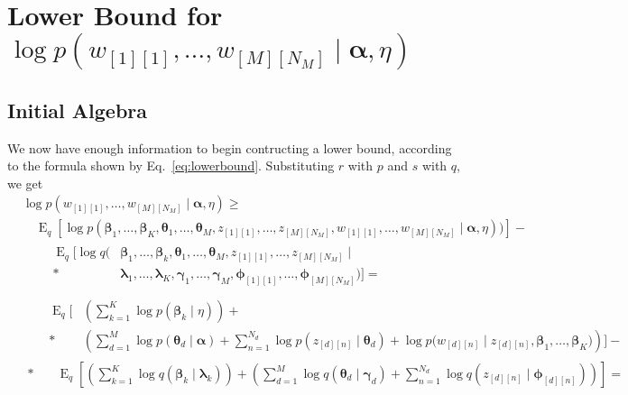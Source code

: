 \documentclass[12pt]{article}
\newcommand{\E}{\operatorname{E}}
\begin{document}
\section{Lower Bound for $\log{p(w_{[1][1]}, \ldots, w_{[M][N_{M}]} \mid
\bm{\alpha}, \eta)}$}

\subsection{Initial Algebra}

We now have enough information to begin contructing a lower bound, according to
the formula shown by Eq.~\ref{eq:lowerbound}.  Substituting $r$ with $p$ and $s$
with $q$, we get
\begin{align}
    &\log{p(w_{[1][1]}, \ldots, w_{[M][N_{M}]} \mid \bm{\alpha}, \eta)} \geq
    \nonumber\\
    &\quad\E_{q}[\log{p(\bm{\beta}_{1}, \ldots, \bm{\beta}_{K}, \bm{\theta}_{1},
    \ldots,
    \bm{\theta}_{M}, z_{[1][1]}, \ldots, z_{[M][N_{M}]}, w_{[1][1]}, \ldots,
    w_{[M][N_{M}]} \mid \bm{\alpha}, \eta))}] - \nonumber\\
    &\quad\quad\begin{aligned}
    \E_{q}[\log q(&\bm{\beta}_{1}, \ldots, \bm{\beta}_{k}, \bm{\theta}_{1}, \ldots,
    \bm{\theta}_{M}, z_{[1][1]}, \ldots, z_{[M][N_{M}]} \mid \\*
    &\bm{\lambda}_{1},
    \ldots, \bm{\lambda}_{K}, \bm{\gamma}_{1}, \ldots, \bm{\gamma}_{M},
    \bm{\phi}_{[1][1]}, \ldots, \bm{\phi}_{[M][N_{M}]})] =
    \end{aligned} \nonumber\\
    &\begin{aligned}
    &\begin{aligned}\E_{q}[&\left(\sum_{k=1}^{K} \log{p(\bm{\beta}_{k} \mid
    \eta)}\right) + \\*
    &\left(\sum_{d=1}^{M}\log{p(\bm{\theta}_{d} \mid
    \bm{\alpha})} + \sum_{n=1}^{N_{d}}\log{p(z_{[d][n]} \mid \bm{\theta}_{d})} +
    \log{p(w_{[d][n]} \mid z_{[d][n]}, \bm{\beta}_{1}, \ldots,
    \bm{\beta}_{K}})\right)] - \end{aligned} \\*
    &\quad\E_{q}[
    \left(\sum_{k=1}^{K}
    \log{q(\bm{\beta}_{k} \mid \bm{\lambda}_{k})}\right)
    + \left(\sum_{d=1}^{M}\log{q(\bm{\theta}_{d} \mid \bm{\gamma}_{d})}
    + \sum_{n=1}^{N_{d}}\log{q(z_{[d][n]} \mid
    \bm{\phi}_{[d][n]})}\right)] =
    \end{aligned}\label{eq:ldalb1} \\

\end{align}
\end{document}
